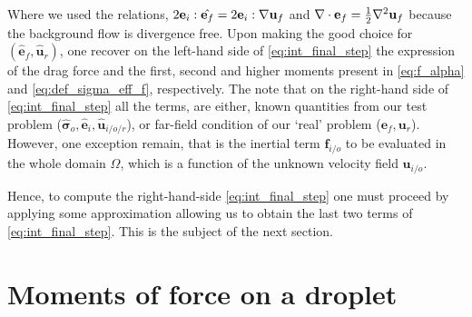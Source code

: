 Where we used the relations, $2{\textbf{e}_i} : \hat{\textbf{e}_f}= 2{\textbf{e}_i} : {\mathbf{\nabla}\textbf{u}_f}$ and $\mathbf{\nabla}\cdot\textbf{e}_f = \frac{1}{2}\mathbf{\nabla}^2 \textbf{u}_f$ because the background flow is divergence free. 
Upon making the good choice for $(\hat{\textbf{e}}_f, \hat{\textbf{u}}_r)$, one recover on the left-hand side of \ref{eq:int_final_step} the expression of the drag force and the first, second and higher moments present in \ref{eq:f_alpha} and \ref{eq:def_sigma_eff_f}, respectively. 
The note that on the right-hand side of \ref{eq:int_final_step} all the terms, are either, known quantities from our test problem ($\hat{\bm\sigma}_{o},\hat{\textbf{e}}_i, \hat{\textbf{u}}_{i/o/r}$), or far-field condition of our `real' problem ($\textbf{e}_f,\textbf{u}_r$). 
However, one exception remain, that is the inertial term $\textbf{f}_{i/o}$ to be evaluated in the whole domain $\Omega$, which is a function of the unknown velocity field $\textbf{u}_{i/o}$. 

Hence, to compute the right-hand-side \ref{eq:int_final_step} one must proceed by applying some approximation allowing us to obtain the last two terms of \ref{eq:int_final_step}. 
This is the subject of the next section. 




\section{Moments of force on a droplet}


